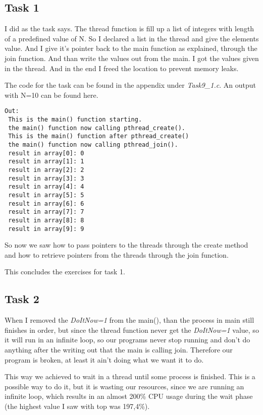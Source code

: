 \subsection*{Task 1}
I did as the task says. The thread function is fill up a list of integers with length of a predefined value of N. So I declared a list in the thread and give the elements value. And I give it's pointer back to the main function as explained, through the join function. And than write the values out from the main. I got the values given in the thread. And in the end I freed the location to prevent memory leaks. 

The code for the task can be found in the appendix under \textit{Task9\_1.c}. An output with N=10 can be found here.

\begin{lstlisting}[basicstyle=\ttfamily,frame=single]
Out: 
 This is the main() function starting.
 the main() function now calling pthread_create().
 This is the main() function after pthread_create()
 the main() function now calling pthread_join().
 result in array[0]: 0
 result in array[1]: 1
 result in array[2]: 2
 result in array[3]: 3
 result in array[4]: 4
 result in array[5]: 5
 result in array[6]: 6
 result in array[7]: 7
 result in array[8]: 8
 result in array[9]: 9
\end{lstlisting} 

So now we saw how to pass pointers to the threads through the create method and how to retrieve pointers from the threads through the join function. 

This concludes the exercises for task 1. 

\subsection*{Task 2}
When I removed the \textit{DoItNow=1} from the main(), than the process in main still finishes in order, but since the thread function never get the \textit{DoItNow=1} value, so it will run in an infinite loop, so our programs never stop running and don't do anything after the writing out that the main is calling join. Therefore our program is broken, at least it ain't doing what we want it to do.

This way we achieved to wait in a thread until some process is finished. This is a possible way to do it, but it is wasting our resources, since we are running an infinite loop, which results in an almost 200\% CPU usage during the wait phase (the highest value I saw with top was 197,4\%).

